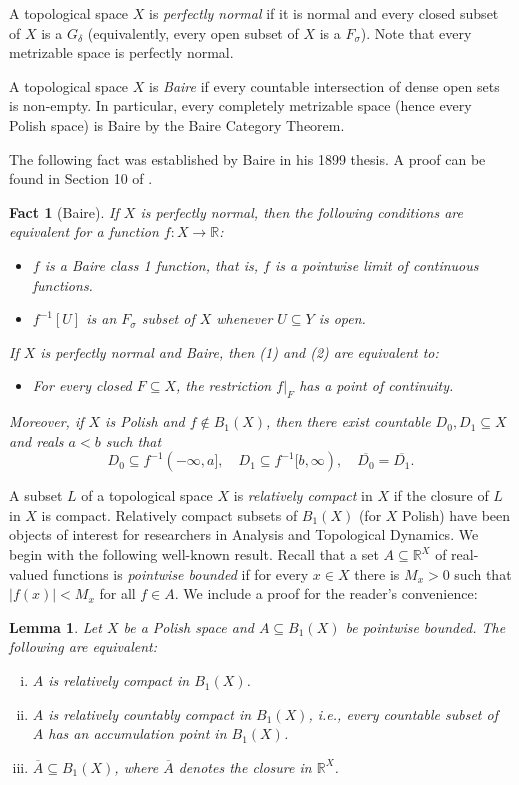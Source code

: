 \documentclass[psamsfonts]{amsart}
\newtheorem{lem}[thm]{Lemma}
\newtheorem{fact}[thm]{Fact}
\theoremstyle{definition}
\theoremstyle{remark}
\numberwithin{equation}{section}
\begin{document}
A topological space $X$ is \emph{perfectly normal} if it is normal and every closed subset of $X$ is a $G_\delta$ (equivalently, every open subset of $X$ is a $F_\sigma$).
Note that every metrizable space is perfectly normal.

A topological space $X$ is \emph{Baire} if every countable intersection of dense open sets is non-empty.
In particular, every completely metrizable space (hence every Polish space) is Baire by the Baire Category Theorem.

The following fact was established by  Baire in his 1899 thesis.
A proof can be found in Section 10 of \cite{Todorcevic_1997_TopicsTop}.

\begin{fact}[Baire]\label{baire}
    If $X$ is perfectly normal, then the following conditions are equivalent for a function $f:X\to \mathbb{R}$:
    \begin{itemize}
        \item[(1)] $f$ is a Baire class 1 function, that is,  $f$ is a pointwise limit of continuous functions.
        \item[(2)] $f^{-1}[U]$ is an $F_\sigma$ subset of $X$ whenever $U\subseteq Y$ is open.
    \end{itemize}
    If $X$ is perfectly normal and Baire, then (1) and (2) are equivalent to:
    \begin{itemize}
        \item[(3)] For every closed $F\subseteq X$, the restriction $f|_F$ has a point of continuity.
    \end{itemize}
    Moreover, if $X$ is Polish and $f\notin B_1(X)$, then there exist countable $D_0,D_1\subseteq X$ and reals $a<b$ such that
    \[
    D_0\subseteq f^{-1}(-\infty,a],
    \quad
    D_1\subseteq f^{-1}[b,\infty),
    \quad
    \overline{D_0}=\overline{D_1}.
    \]
\end{fact}

A subset $L$ of a topological space $X$ is \emph{relatively compact} in $X$ if the closure of $L$ in $X$ is compact.
Relatively compact subsets of $B_1(X)$ (for $X$ Polish) have been objects of interest  for researchers in Analysis and Topological Dynamics.
We begin with the following well-known result.
Recall that a set $A\subseteq\mathbb{R}^X$ of real-valued functions is \emph{pointwise bounded} if for every $x\in X$ there is $M_x>0$ such that $|f(x)|<M_x$ for all $f\in A$.
We include a proof for the reader's convenience:

\begin{lem}
    Let $X$ be a Polish space and $A\subseteq B_1(X)$ be pointwise bounded.
The following are equivalent:
    \begin{enumerate}[(i)]
        \item
        $A$ is relatively compact in $B_1(X)$.
        \item
        $A$ is relatively countably compact in $B_1(X)$, i.e., every countable subset of $A$ has an accumulation point in $B_1(X)$.
        \item
        $\overline{A}\subseteq B_1(X)$, where $\overline{A}$ denotes the closure in $\mathbb{R}^X$.
    \end{enumerate}
\end{lem}
\end{document}
